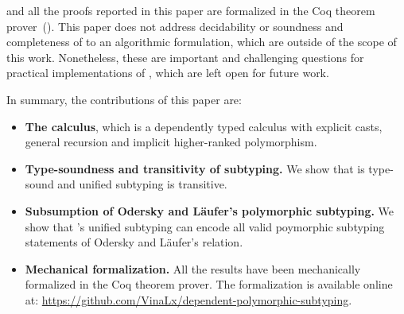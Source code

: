 \name and all the proofs reported in this paper are formalized in the Coq theorem
prover~(\citeauthor{coqsite}).
This paper
does not address decidability or soundness and completeness of \name to an
algorithmic formulation, which are outside of the scope of this work.
Nonetheless, these are important and challenging
questions for practical implementations of \name, which are left open for future work.

In summary, the contributions of this paper are:

\begin{itemize}

\item {\bf The \name calculus}, which is a dependently typed calculus with explicit casts,
  general recursion and implicit higher-ranked polymorphism.

\item {\bf Type-soundness and transitivity of subtyping.} We show that \name
  is type-sound and unified subtyping is transitive.

\item {\bf Subsumption of Odersky and L\"aufer's polymorphic subtyping.} We show that \name's
  unified subtyping can encode all valid poymorphic subtyping statements of Odersky and L\"aufer's
  relation.

\item {\bf Mechanical formalization.} All the results have been mechanically
  formalized in the Coq theorem prover. The formalization is available online at:
  \url{https://github.com/VinaLx/dependent-polymorphic-subtyping}.

\end{itemize}
